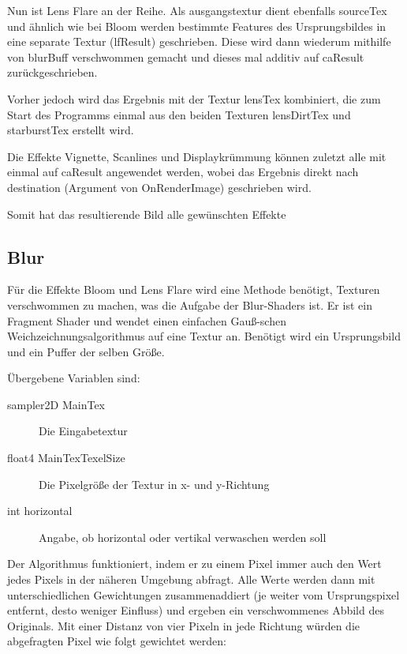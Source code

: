 Nun ist Lens Flare an der Reihe. Als ausgangstextur dient ebenfalls sourceTex und ähnlich wie bei Bloom werden bestimmte Features des Ursprungsbildes in eine separate Textur (lfResult) geschrieben. Diese wird dann wiederum mithilfe von blurBuff verschwommen gemacht und dieses mal additiv auf caResult zurückgeschrieben. 


Vorher jedoch wird das Ergebnis mit der Textur lensTex kombiniert, die zum Start des Programms einmal aus den beiden Texturen lensDirtTex und starburstTex erstellt wird.


Die Effekte Vignette, Scanlines und Displaykrümmung können zuletzt alle mit einmal auf caResult angewendet werden, wobei das Ergebnis direkt nach destination (Argument von OnRenderImage) geschrieben wird.


Somit hat das resultierende Bild alle gewünschten Effekte



\subsection{Blur}

Für die Effekte Bloom und Lens Flare wird eine Methode benötigt, Texturen verschwommen zu machen, was die Aufgabe der Blur-Shaders ist.
Er ist ein Fragment Shader und wendet einen einfachen Gau{\ss}-schen Weichzeichnungsalgorithmus auf eine Textur an. Benötigt wird ein Ursprungsbild und ein Puffer der selben Grö{\ss}e.

Übergebene Variablen sind:
\begin{description}
\item[sampler2D MainTex] Die Eingabetextur
\item[float4 MainTexTexelSize] Die Pixelgröße der Textur in x- und y-Richtung
\item[int horizontal] Angabe, ob horizontal oder vertikal verwaschen werden soll
\end{description}

Der Algorithmus funktioniert, indem er zu einem Pixel immer auch den Wert jedes Pixels in der näheren Umgebung abfragt. Alle Werte werden dann mit unterschiedlichen Gewichtungen zusammenaddiert (je weiter vom Ursprungspixel entfernt, desto weniger Einfluss) und ergeben ein verschwommenes Abbild des Originals. Mit einer Distanz von vier Pixeln in jede Richtung würden die abgefragten Pixel wie folgt gewichtet werden:

